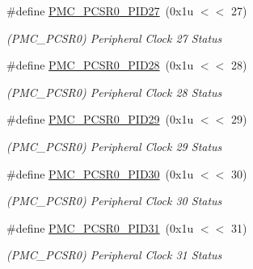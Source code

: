 \begin{DoxyCompactItemize}
\mbox{\label{group__SAMV71__PMC_gaf258aa130d9c532be355c183873e67a2}} 
\#define \mbox{\hyperlink{group__SAMV71__PMC_gaf258aa130d9c532be355c183873e67a2}{P\+M\+C\+\_\+\+P\+C\+S\+R0\+\_\+\+P\+I\+D27}}~(0x1u $<$$<$ 27)
\begin{DoxyCompactList}\small\item\em (P\+M\+C\+\_\+\+P\+C\+S\+R0) Peripheral Clock 27 Status \end{DoxyCompactList}\item 
\mbox{\label{group__SAMV71__PMC_ga3f6889a313e24f63fb6c479534539535}} 
\#define \mbox{\hyperlink{group__SAMV71__PMC_ga3f6889a313e24f63fb6c479534539535}{P\+M\+C\+\_\+\+P\+C\+S\+R0\+\_\+\+P\+I\+D28}}~(0x1u $<$$<$ 28)
\begin{DoxyCompactList}\small\item\em (P\+M\+C\+\_\+\+P\+C\+S\+R0) Peripheral Clock 28 Status \end{DoxyCompactList}\item 
\mbox{\label{group__SAMV71__PMC_gabe1ff287c30c03e44cd9e76ae90bdf02}} 
\#define \mbox{\hyperlink{group__SAMV71__PMC_gabe1ff287c30c03e44cd9e76ae90bdf02}{P\+M\+C\+\_\+\+P\+C\+S\+R0\+\_\+\+P\+I\+D29}}~(0x1u $<$$<$ 29)
\begin{DoxyCompactList}\small\item\em (P\+M\+C\+\_\+\+P\+C\+S\+R0) Peripheral Clock 29 Status \end{DoxyCompactList}\item 
\mbox{\label{group__SAMV71__PMC_ga9fab50748c6e80609be228b4a39a7486}} 
\#define \mbox{\hyperlink{group__SAMV71__PMC_ga9fab50748c6e80609be228b4a39a7486}{P\+M\+C\+\_\+\+P\+C\+S\+R0\+\_\+\+P\+I\+D30}}~(0x1u $<$$<$ 30)
\begin{DoxyCompactList}\small\item\em (P\+M\+C\+\_\+\+P\+C\+S\+R0) Peripheral Clock 30 Status \end{DoxyCompactList}\item 
\mbox{\label{group__SAMV71__PMC_ga737a1566079f4040ca78725ec7a8c660}} 
\#define \mbox{\hyperlink{group__SAMV71__PMC_ga737a1566079f4040ca78725ec7a8c660}{P\+M\+C\+\_\+\+P\+C\+S\+R0\+\_\+\+P\+I\+D31}}~(0x1u $<$$<$ 31)
\begin{DoxyCompactList}\small\item\em (P\+M\+C\+\_\+\+P\+C\+S\+R0) Peripheral Clock 31 Status \end{DoxyCompactList}\item 
$$
\end{DoxyCompactItemize}
